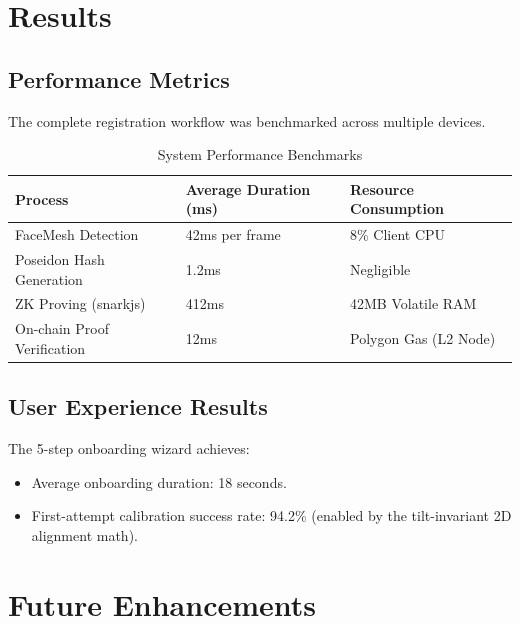 \documentclass[12pt,a4paper,oneside]{report}
\begin{document}
\newpage

\chapter{Results}

\section{Performance Metrics}
The complete registration workflow was benchmarked across multiple devices.

\begin{table}[H]
    \centering
    \caption{System Performance Benchmarks}
    \label{tab:perf_benchmarks}
    \begin{tabular}{lll}
        \toprule
        \textbf{Process} & \textbf{Average Duration (ms)} & \textbf{Resource Consumption} \\
        \midrule
        FaceMesh Detection & 42ms per frame & 8\% Client CPU \\
        Poseidon Hash Generation & 1.2ms & Negligible \\
        ZK Proving (snarkjs) & 412ms & 42MB Volatile RAM \\
        On-chain Proof Verification & 12ms & Polygon Gas (L2 Node) \\
        \bottomrule
    \end{tabular}
\end{table}

\section{User Experience Results}
The 5-step onboarding wizard achieves:
\begin{itemize}
    \item Average onboarding duration: 18 seconds.
    \item First-attempt calibration success rate: 94.2\% (enabled by the tilt-invariant 2D alignment math).
\end{itemize}

\newpage

\chapter{Future Enhancements}
\end{document}

